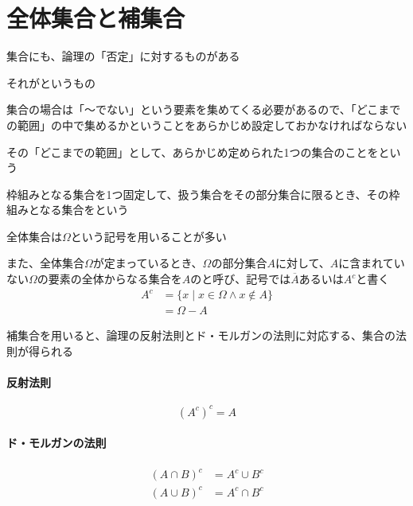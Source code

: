 \documentclass[../book_ronri-and-set]{subfiles}
\begin{document}
\sectionline
\section{全体集合と補集合}

集合にも、論理の「否定」に対するものがある

それがというもの

\br

集合の場合は「〜でない」という要素を集めてくる必要があるので、「どこまでの範囲」の中で集めるかということをあらかじめ設定しておかなければならない

その「どこまでの範囲」として、あらかじめ定められた1つの集合のことをという

\sectionline

枠組みとなる集合を1つ固定して、扱う集合をその部分集合に限るとき、その枠組みとなる集合をという

全体集合は$\Omega $という記号を用いることが多い

\br

また、全体集合$\Omega $が定まっているとき、$\Omega$の部分集合$A$に対して、$A$に含まれていない$\Omega$の要素の全体からなる集合を$A$のと呼び、記号では$\overline{A}$あるいは$A^c$と書く
\begin{align*}
  A^c & = \{x \mid x \in \Omega \land x \notin A\} \\
      & = \Omega - A
\end{align*}

\sectionline

補集合を用いると、論理の反射法則とド・モルガンの法則に対応する、集合の法則が得られる

\begin{oframed}
  \paragraph{反射法則}
  \begin{equation*}
    (A^c)^c = A
  \end{equation*}
\end{oframed}

\begin{oframed}
  \paragraph{ド・モルガンの法則}
  \begin{align*}
    (A \cap B)^c & = A^c \cup B^c \\
    (A \cup B)^c & = A^c \cap B^c
  \end{align*}
\end{oframed}
\end{document}
